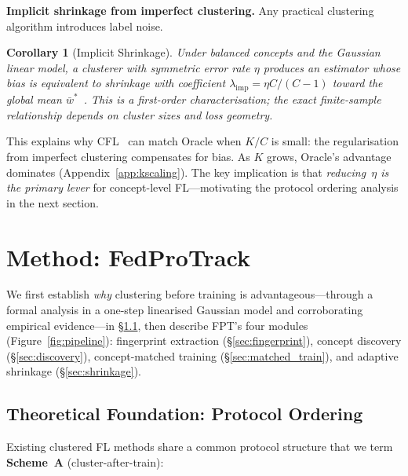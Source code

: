 \documentclass[11pt]{article}
\newcommand{\wbar}{\bar{w}}
\newtheorem{corollary}[theorem]{Corollary}
\begin{document}
\textbf{Implicit shrinkage from imperfect clustering.}
Any practical clustering algorithm introduces label noise.

\begin{corollary}[Implicit Shrinkage]
\label{cor:implicit}
Under balanced concepts and the Gaussian linear model, a clusterer with symmetric error rate $\eta$ produces an estimator whose bias is equivalent to shrinkage with coefficient $\lambda_{\mathrm{imp}} = \eta C/(C{-}1)$ toward the global mean $\wbar^*$~\citep{efron1973stein, james1961estimation}.
This is a first-order characterisation; the exact finite-sample relationship depends on cluster sizes and loss geometry.
\end{corollary}

\noindent This explains why CFL~\citep{sattler2021clustered} can match Oracle when $K/C$ is small: the regularisation from imperfect clustering compensates for bias.
As $K$ grows, Oracle's advantage dominates (Appendix~\ref{app:kscaling}).
The key implication is that \emph{reducing~$\eta$ is the primary lever} for concept-level FL---motivating the protocol ordering analysis in the next section.


\section{Method: FedProTrack}
\label{sec:method}

We first establish \emph{why} clustering before training is advantageous---through a formal analysis in a one-step linearised Gaussian model and corroborating empirical evidence---in \S\ref{sec:protocol_ordering}, then describe FPT's four modules (Figure~\ref{fig:pipeline}): fingerprint extraction (\S\ref{sec:fingerprint}), concept discovery (\S\ref{sec:discovery}), concept-matched training (\S\ref{sec:matched_train}), and adaptive shrinkage (\S\ref{sec:shrinkage}).

\subsection{Theoretical Foundation: Protocol Ordering}
\label{sec:protocol_ordering}

Existing clustered FL methods share a common protocol structure that we term \textbf{Scheme~A} (cluster-after-train):
\end{document}
